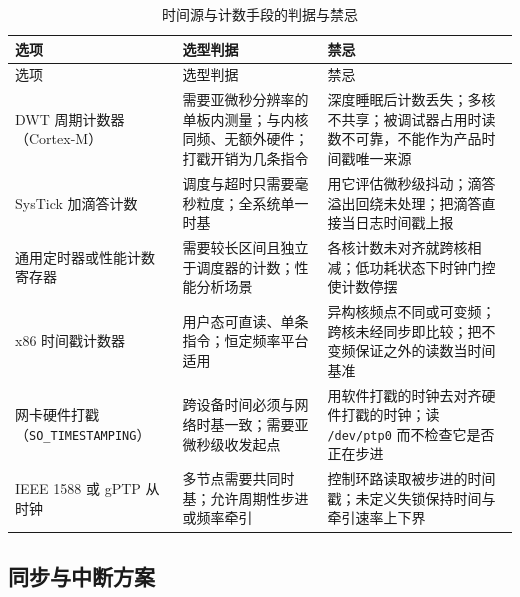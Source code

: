 \documentclass[12pt,a4paper,fontset=fandol]{ctexbook}
\newcommand{\Tp}[1]{\texttt{#1}}
\newcommand{\Bk}{\discretionary{}{}{}}
\begin{document}
\begin{longtable}{>{\raggedright\arraybackslash\footnotesize}p{}>{\raggedright\arraybackslash\footnotesize}p{}>{\raggedright\arraybackslash\footnotesize}p{}}
\caption{时间源与计数手段的判据与禁忌}\label{tab:apC-clocksrc} \\
\toprule
选项 & 选型判据 & 禁忌 \\
\midrule
\endfirsthead
\toprule
选项 & 选型判据 & 禁忌 \\
\midrule
\endhead
\bottomrule
\endfoot
\endlastfoot
DWT 周期计数器（Cortex-M） & 需要亚微秒分辨率的单板内测量；与内核同频、无额外硬件；打戳开销为几条指令 & 深度睡眠后计数丢失；多核不共享；被调试器占用时读数不可靠，不能作为产品时间戳唯一来源 \\
SysTick 加滴答计数 & 调度与超时只需要毫秒粒度；全系统单一时基 & 用它评估微秒级抖动；滴答溢出回绕未处理；把滴答直接当日志时间戳上报 \\
通用定时器或性能计数寄存器 & 需要较长区间且独立于调度器的计数；性能分析场景 & 各核计数未对齐就跨核相减；低功耗状态下时钟门控使计数停摆 \\
x86 时间戳计数器 & 用户态可直读、单条指令；恒定频率平台适用 & 异构核频点不同或可变频；跨核未经同步即比较；把不变频保证之外的读数当时间基准 \\
网卡硬件打戳（\Tp{SO\_{\Bk}TIMESTAMPING}） & 跨设备时间必须与网络时基一致；需要亚微秒级收发起点 & 用软件打戳的时钟去对齐硬件打戳的时钟；读 \Tp{/{\Bk}dev/{\Bk}ptp0} 而不检查它是否正在步进 \\
IEEE 1588 或 gPTP 从时钟 & 多节点需要共同时基；允许周期性步进或频率牵引 & 控制环路读取被步进的时间戳；未定义失锁保持时间与牵引速率上下界 \\
\end{longtable}

\subsection{同步与中断方案}
\end{document}
